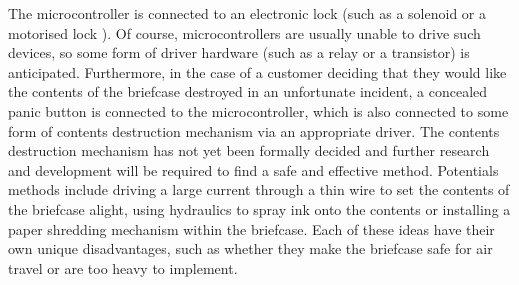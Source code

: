 The microcontroller is connected to an electronic lock (such as a solenoid \cite{solenoidDigikey} or a motorised lock \cite{motorisedLock}). Of course, microcontrollers are usually unable to drive such devices, so some form of driver hardware (such as a relay or a transistor) is anticipated. Furthermore, in the case of a customer deciding that they would like the contents of the briefcase destroyed in an unfortunate incident, a concealed panic button is connected to the microcontroller, which is also connected to some form of contents destruction mechanism via an appropriate driver. The contents destruction mechanism has not yet been formally decided and further research and development will be required to find a safe and effective method. Potentials methods include driving a large current through a thin wire to set the contents of the briefcase alight, using hydraulics to spray ink onto the contents or installing a paper shredding mechanism within the briefcase. Each of these ideas have their own unique disadvantages, such as whether they make the briefcase safe for air travel or are too heavy to implement.